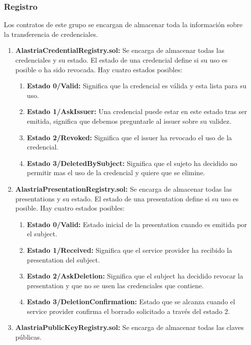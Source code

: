 \subsubsection{Registro}
Los contratos de este grupo se encargan de almacenar toda la información sobre la transferencia de credenciales.
\begin{enumerate}
    \item \textbf{AlastriaCredentialRegistry.sol:} Se encarga de almacenar todas las credenciales y su estado. El estado de una credencial define si su uso es posible o ha sido revocada. Hay cuatro estados posibles:
    \begin{enumerate}
        \item \textbf{Estado 0/Valid:} Significa que la credencial es válida y esta lista para su uso.
        \item \textbf{Estado 1/AskIssuer:} Una credencial puede estar en este estado tras ser emitida, significa que debemos preguntarle al issuer sobre su validez.
        \item \textbf{Estado 2/Revoked:} Significa que el issuer ha revocado el uso de la credencial.
        \item \textbf{Estado 3/DeletedBySubject:} Significa que el sujeto ha decidido no permitir mas el uso de la credencial y quiere que se elimine.
    \end{enumerate}
    \item \textbf{AlastriaPresentationRegistry.sol:} Se encarga de almacenar todas las presentations y su estado. El estado de una presentation define si su uso es posible. Hay cuatro estados posibles:
    \begin{enumerate}
        \item \textbf{Estado 0/Valid:} Estado inicial de la presentation cuando es emitida por el subject.
        \item \textbf{Estado 1/Received:} Significa que el service provider ha recibido la presentation del subject.
        \item \textbf{Estado 2/AskDeletion:} Significa que el subject ha decidido revocar la presentation y que no se usen las credenciales que contiene.
        \item \textbf{Estado 3/DeletionConfirmation:} Estado que se alcanza cuando el service provider confirma el borrado solicitado a través del estado 2.
    \end{enumerate}
    \item \textbf{AlastriaPublicKeyRegistry.sol:} Se encarga de almacenar todas las claves públicas.
\end{enumerate}
